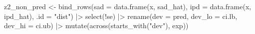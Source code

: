 \documentclass[
  letterpaper,
  DIV=11,
  numbers=noendperiod]{scrartcl}
\newenvironment{Shaded}{\begin{snugshade}}{\end{snugshade}}
\newcommand{\AttributeTok}[1]{\textcolor[rgb]{0.40,0.45,0.13}{#1}}
\newcommand{\FunctionTok}[1]{\textcolor[rgb]{0.28,0.35,0.67}{#1}}
\newcommand{\NormalTok}[1]{\textcolor[rgb]{0.00,0.23,0.31}{#1}}
\newcommand{\OtherTok}[1]{\textcolor[rgb]{0.00,0.23,0.31}{#1}}
\newcommand{\SpecialCharTok}[1]{\textcolor[rgb]{0.37,0.37,0.37}{#1}}
\newcommand{\StringTok}[1]{\textcolor[rgb]{0.13,0.47,0.30}{#1}}
\begin{document}
\begin{Shaded}
\begin{Highlighting}[]
\NormalTok{z2\_non\_pred }\OtherTok{\textless{}{-}} \FunctionTok{bind\_rows}\NormalTok{(}\AttributeTok{sad =} \FunctionTok{data.frame}\NormalTok{(x, sad\_hat), }
                         \AttributeTok{ipd =} \FunctionTok{data.frame}\NormalTok{(x, ipd\_hat), }
                         \AttributeTok{.id =} \StringTok{"dist"}\NormalTok{) }\SpecialCharTok{|\textgreater{}} 
    \FunctionTok{select}\NormalTok{(}\SpecialCharTok{!}\NormalTok{se) }\SpecialCharTok{|\textgreater{}} 
    \FunctionTok{rename}\NormalTok{(}\AttributeTok{dev =}\NormalTok{ pred,}
           \AttributeTok{dev\_lo =}\NormalTok{ ci.lb, }
           \AttributeTok{dev\_hi =}\NormalTok{ ci.ub) }\SpecialCharTok{|\textgreater{}} 
    \FunctionTok{mutate}\NormalTok{(}\FunctionTok{across}\NormalTok{(}\FunctionTok{starts\_with}\NormalTok{(}\StringTok{"dev"}\NormalTok{), exp))}


\end{Highlighting}
\end{Shaded}
\end{document}
